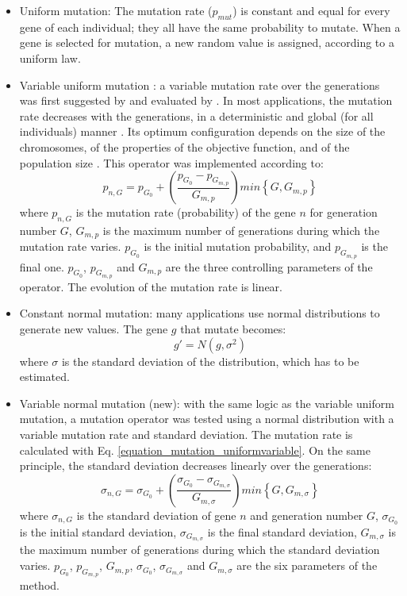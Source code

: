 \documentclass{ametsoc}
\begin{document}
\begin{itemize}
	\item Uniform mutation: The mutation rate ($p_{mut}$) is constant and equal for every gene of each individual; they all have the same probability to mutate. When a gene is selected for mutation, a new random value is assigned, according to a uniform law.
	
	\item Variable uniform mutation \citep{Fogarty1989}: a variable mutation rate over the generations was first suggested by \citet{Holland1992b} and evaluated by \citet{Fogarty1989}. In most applications, the mutation rate decreases with the generations, in a deterministic and global (for all individuals) manner \citep{Back1992b}. Its optimum configuration depends on the size of the chromosomes, of the properties of the objective function, and of the population size \citep{Back1992b}. This operator was implemented according to:
	\begin{equation}
	p_{n,G} = p_{G_{0}}+\left( \dfrac{p_{G_{0}}-p_{G_{m,p}}}{G_{m,p}} \right) min\left\lbrace G,G_{m,p}\right\rbrace 
	\label{equation_mutation_uniformvariable}
	\end{equation}
	where $p_{n,G}$ is the mutation rate (probability) of the gene $n$ for generation number $G$, $G_{m,p}$ is the maximum number of generations during which the mutation rate varies. $p_{G_{0}}$ is the initial mutation probability, and $p_{G_{m,p}}$ is the final one. $p_{G_{0}}$, $p_{G_{m,p}}$ and $G_{m,p}$ are the three controlling parameters of the operator. The evolution of the mutation rate is linear.
	
	\item Constant normal mutation: many applications use normal distributions to generate new values. The gene $g$ that mutate becomes:
	\begin{equation}
	g' = N(g,\sigma^{2})
	\label{equation_mutating_normal_distribution}
	\end{equation}
	where $\sigma$ is the standard deviation of the distribution, which has to be estimated.
	
	\item Variable normal mutation (new): with the same logic as the variable uniform mutation, a mutation operator was tested using a normal distribution with a variable mutation rate and standard deviation. The mutation rate is calculated with Eq. \ref{equation_mutation_uniformvariable}. On the same principle, the standard deviation decreases linearly over the generations:
	\begin{equation}
	\sigma_{n,G} = \sigma_{G_{0}}+\left( \dfrac{\sigma_{G_{0}}-\sigma_{G_{m,\sigma}}}{G_{m,\sigma}} \right) min\left\lbrace G,G_{m,\sigma}\right\rbrace 
	\label{equation_mutation_normalvariable}
	\end{equation}
	where $\sigma_{n,G}$ is the standard deviation of gene $n$ and generation number $G$, $\sigma_{G_{0}}$ is the initial standard deviation, $\sigma_{G_{m,\sigma}}$ is the final standard deviation, $G_{m,\sigma}$ is the maximum number of generations during which the standard deviation varies. $p_{G_{0}}$, $p_{G_{m,p}}$, $G_{m,p}$, $\sigma_{G_{0}}$, $\sigma_{G_{m,\sigma}}$ and $G_{m,\sigma}$ are the six parameters of the method.
	

\end{itemize}
\end{document}
